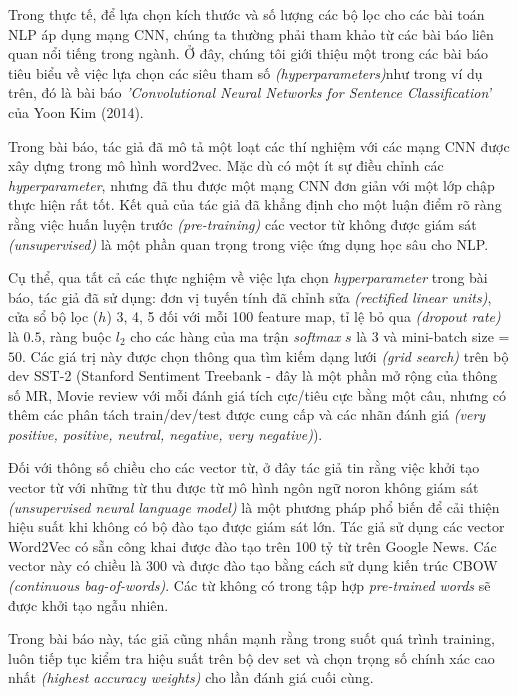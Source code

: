 Trong thực tế, để lựa chọn kích thước và số lượng các bộ lọc cho các bài toán NLP áp dụng mạng CNN, chúng ta thường phải tham khảo từ các bài báo liên quan nổi tiếng trong ngành. Ở đây, chúng tôi giới thiệu một trong các bài báo tiêu biểu về việc lựa chọn các siêu tham số \textit{(hyperparameters)}như trong ví dụ trên, đó là bài báo \textit{'Convolutional Neural Networks for Sentence Classification'} của Yoon Kim (2014).

Trong bài báo, tác giả đã mô tả một loạt các thí nghiệm với các mạng CNN được xây dựng trong mô hình word2vec. Mặc dù có một ít sự điều chỉnh các \textit{hyperparameter}, nhưng đã thu được một mạng CNN đơn giản với một lớp chập thực hiện rất tốt. Kết quả của tác giả đã khẳng định cho một luận điểm rõ ràng rằng việc huấn luyện trước \textit{(pre-training)} các vector từ không được giám sát \textit{(unsupervised)} là một phần quan trọng trong việc ứng dụng học sâu cho NLP.

Cụ thể, qua tất cả các thực nghiệm về việc lựa chọn \textit{hyperparameter} trong bài báo, tác giả đã sử dụng: đơn vị tuyến tính đã chỉnh sửa \textit{(rectified linear units)}, cửa sổ bộ lọc ($h$) 3, 4, 5 đối với mỗi 100 feature map, tỉ lệ bỏ qua \textit{(dropout rate)} là $0.5$, ràng buộc $l_2$ cho các hàng của ma trận \textit{softmax} $s$ là 3 và mini-batch size = $50$. Các giá trị này được chọn thông qua tìm kiếm dạng lưới \textit{(grid search)} trên bộ dev SST-2 (Stanford Sentiment Treebank - đây là một phần mở rộng của thông số MR, Movie review với mỗi đánh giá tích cực/tiêu cực bằng một câu, nhưng có thêm các phân tách train/dev/test được cung cấp và các nhãn đánh giá \textit{(very positive, positive, neutral, negative, very negative)}).

Đối với thông số chiều cho các vector từ, ở đây tác giả tin rằng việc khởi tạo vector từ với những từ thu được từ mô hình ngôn ngữ noron không giám sát \textit{(unsupervised neural language model)} là một phương pháp phổ biến để cải thiện hiệu suất khi không có bộ đào tạo được giám sát lớn. Tác giả sử dụng các vector Word2Vec có sẵn công khai được đào tạo trên 100 tỷ từ trên Google News. Các vector này có chiều là 300 và được đào tạo bằng cách sử dụng kiến trúc CBOW \textit{(continuous bag-of-words)}. Các từ không có trong tập hợp \textit{pre-trained words} sẽ được khởi tạo ngẫu nhiên.

Trong bài báo này, tác giả cũng nhấn mạnh rằng trong suốt quá trình training, luôn tiếp tục kiểm tra hiệu suất trên bộ dev set và chọn trọng số chính xác cao nhất \textit{(highest accuracy weights)} cho lần đánh giá cuối cùng.

